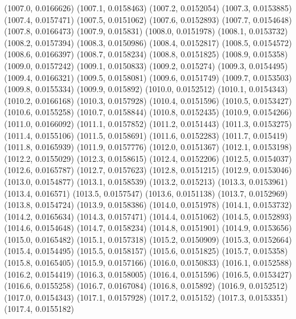 {					(1007.0, 0.0166626)
					(1007.1, 0.0158463)
					(1007.2, 0.0152054)
					(1007.3, 0.0153885)
					(1007.4, 0.0157471)
					(1007.5, 0.0151062)
					(1007.6, 0.0152893)
					(1007.7, 0.0154648)
					(1007.8, 0.0166473)
					(1007.9, 0.015831)
					(1008.0, 0.0151978)
					(1008.1, 0.0153732)
					(1008.2, 0.0157394)
					(1008.3, 0.0150986)
					(1008.4, 0.0152817)
					(1008.5, 0.0154572)
					(1008.6, 0.0166397)
					(1008.7, 0.0158234)
					(1008.8, 0.0151825)
					(1008.9, 0.015358)
					(1009.0, 0.0157242)
					(1009.1, 0.0150833)
					(1009.2, 0.015274)
					(1009.3, 0.0154495)
					(1009.4, 0.0166321)
					(1009.5, 0.0158081)
					(1009.6, 0.0151749)
					(1009.7, 0.0153503)
					(1009.8, 0.0155334)
					(1009.9, 0.015892)
					(1010.0, 0.0152512)
					(1010.1, 0.0154343)
					(1010.2, 0.0166168)
					(1010.3, 0.0157928)
					(1010.4, 0.0151596)
					(1010.5, 0.0153427)
					(1010.6, 0.0155258)
					(1010.7, 0.0158844)
					(1010.8, 0.0152435)
					(1010.9, 0.0154266)
					(1011.0, 0.0166092)
					(1011.1, 0.0157852)
					(1011.2, 0.0151443)
					(1011.3, 0.0153275)
					(1011.4, 0.0155106)
					(1011.5, 0.0158691)
					(1011.6, 0.0152283)
					(1011.7, 0.015419)
					(1011.8, 0.0165939)
					(1011.9, 0.0157776)
					(1012.0, 0.0151367)
					(1012.1, 0.0153198)
					(1012.2, 0.0155029)
					(1012.3, 0.0158615)
					(1012.4, 0.0152206)
					(1012.5, 0.0154037)
					(1012.6, 0.0165787)
					(1012.7, 0.0157623)
					(1012.8, 0.0151215)
					(1012.9, 0.0153046)
					(1013.0, 0.0154877)
					(1013.1, 0.0158539)
					(1013.2, 0.015213)
					(1013.3, 0.0153961)
					(1013.4, 0.016571)
					(1013.5, 0.0157547)
					(1013.6, 0.0151138)
					(1013.7, 0.0152969)
					(1013.8, 0.0154724)
					(1013.9, 0.0158386)
					(1014.0, 0.0151978)
					(1014.1, 0.0153732)
					(1014.2, 0.0165634)
					(1014.3, 0.0157471)
					(1014.4, 0.0151062)
					(1014.5, 0.0152893)
					(1014.6, 0.0154648)
					(1014.7, 0.0158234)
					(1014.8, 0.0151901)
					(1014.9, 0.0153656)
					(1015.0, 0.0165482)
					(1015.1, 0.0157318)
					(1015.2, 0.0150909)
					(1015.3, 0.0152664)
					(1015.4, 0.0154495)
					(1015.5, 0.0158157)
					(1015.6, 0.0151825)
					(1015.7, 0.015358)
					(1015.8, 0.0165405)
					(1015.9, 0.0157166)
					(1016.0, 0.0150833)
					(1016.1, 0.0152588)
					(1016.2, 0.0154419)
					(1016.3, 0.0158005)
					(1016.4, 0.0151596)
					(1016.5, 0.0153427)
					(1016.6, 0.0155258)
					(1016.7, 0.0167084)
					(1016.8, 0.015892)
					(1016.9, 0.0152512)
					(1017.0, 0.0154343)
					(1017.1, 0.0157928)
					(1017.2, 0.015152)
					(1017.3, 0.0153351)
					(1017.4, 0.0155182)
}

